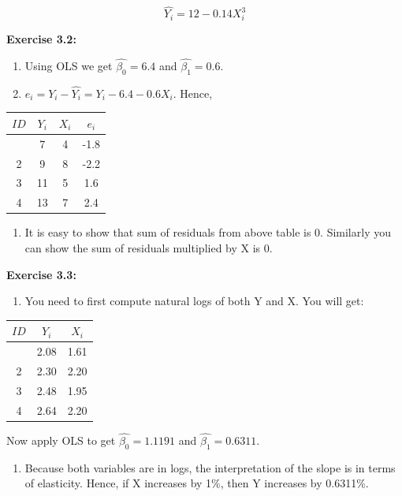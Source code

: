 \documentclass[
]{book}
\providecommand{\tightlist}{%
  \setlength{\itemsep}{0pt}\setlength{\parskip}{0pt}}
\theoremstyle{definition}
\theoremstyle{definition}
\theoremstyle{definition}
\theoremstyle{definition}
\theoremstyle{remark}
\begin{document}
\[\widehat{Y_i}=12 - 0.14 X_i^3\]

\textbf{Exercise 3.2:}

\begin{enumerate}
\def\labelenumi{\alph{enumi}.}
\item
  Using OLS we get \(\widehat{\beta_0}=6.4\) and \(\widehat{\beta_1}=0.6\).
\item
  \(e_i=Y_i-\widehat{Y_i}=Y_i - 6.4-0.6X_i\). Hence,
\end{enumerate}

\begin{longtable}[]{@{}cccc@{}}
\toprule\noalign{}
\(ID\) & \(Y_i\) & \(X_i\) & \(e_i\) \\
\midrule\noalign{}
\endhead
\bottomrule\noalign{}
\endlastfoot
1 & 7 & 4 & -1.8 \\
2 & 9 & 8 & -2.2 \\
3 & 11 & 5 & 1.6 \\
4 & 13 & 7 & 2.4 \\
\end{longtable}

\begin{enumerate}
\def\labelenumi{\alph{enumi}.}
\setcounter{enumi}{2}
\tightlist
\item
  It is easy to show that sum of residuals from above table is 0. Similarly you can show the sum of residuals multiplied by X is 0.
\end{enumerate}

\textbf{Exercise 3.3:}

\begin{enumerate}
\def\labelenumi{\alph{enumi}.}
\tightlist
\item
  You need to first compute natural logs of both Y and X. You will get:
\end{enumerate}

\begin{longtable}[]{@{}ccc@{}}
\toprule\noalign{}
\(ID\) & \(Y_i\) & \(X_i\) \\
\midrule\noalign{}
\endhead
\bottomrule\noalign{}
\endlastfoot
1 & 2.08 & 1.61 \\
2 & 2.30 & 2.20 \\
3 & 2.48 & 1.95 \\
4 & 2.64 & 2.20 \\
\end{longtable}

Now apply OLS to get \(\widehat{\beta_0}=1.1191\) and \(\widehat{\beta_1}=0.6311\).

\begin{enumerate}
\def\labelenumi{\alph{enumi}.}
\setcounter{enumi}{1}
\tightlist
\item
  Because both variables are in logs, the interpretation of the slope is in terms of elasticity. Hence, if X increases by 1\%, then Y increases by 0.6311\%.
\end{enumerate}
\end{document}
